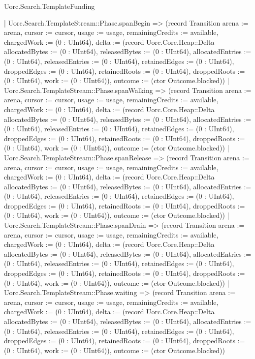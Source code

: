 \begin{lexlean}{Uorc.Search.TemplateFunding}
\begin{semanticmodule}
{      | Uorc.Search.TemplateStream::Phase.spanBegin => (record Transition {arena := arena, cursor := cursor, usage := usage, remainingCredits := available, chargedWork := (0 : UInt64), delta := (record Uorc.Core.Heap::Delta {allocatedBytes := (0 : UInt64), releasedBytes := (0 : UInt64), allocatedEntries := (0 : UInt64), releasedEntries := (0 : UInt64), retainedEdges := (0 : UInt64), droppedEdges := (0 : UInt64), retainedRoots := (0 : UInt64), droppedRoots := (0 : UInt64), work := (0 : UInt64)}), outcome := (ctor Outcome.blocked)})
      | Uorc.Search.TemplateStream::Phase.spanWalking => (record Transition {arena := arena, cursor := cursor, usage := usage, remainingCredits := available, chargedWork := (0 : UInt64), delta := (record Uorc.Core.Heap::Delta {allocatedBytes := (0 : UInt64), releasedBytes := (0 : UInt64), allocatedEntries := (0 : UInt64), releasedEntries := (0 : UInt64), retainedEdges := (0 : UInt64), droppedEdges := (0 : UInt64), retainedRoots := (0 : UInt64), droppedRoots := (0 : UInt64), work := (0 : UInt64)}), outcome := (ctor Outcome.blocked)})
      | Uorc.Search.TemplateStream::Phase.spanRelease => (record Transition {arena := arena, cursor := cursor, usage := usage, remainingCredits := available, chargedWork := (0 : UInt64), delta := (record Uorc.Core.Heap::Delta {allocatedBytes := (0 : UInt64), releasedBytes := (0 : UInt64), allocatedEntries := (0 : UInt64), releasedEntries := (0 : UInt64), retainedEdges := (0 : UInt64), droppedEdges := (0 : UInt64), retainedRoots := (0 : UInt64), droppedRoots := (0 : UInt64), work := (0 : UInt64)}), outcome := (ctor Outcome.blocked)})
      | Uorc.Search.TemplateStream::Phase.spanDrain => (record Transition {arena := arena, cursor := cursor, usage := usage, remainingCredits := available, chargedWork := (0 : UInt64), delta := (record Uorc.Core.Heap::Delta {allocatedBytes := (0 : UInt64), releasedBytes := (0 : UInt64), allocatedEntries := (0 : UInt64), releasedEntries := (0 : UInt64), retainedEdges := (0 : UInt64), droppedEdges := (0 : UInt64), retainedRoots := (0 : UInt64), droppedRoots := (0 : UInt64), work := (0 : UInt64)}), outcome := (ctor Outcome.blocked)})
      | Uorc.Search.TemplateStream::Phase.waiting => (record Transition {arena := arena, cursor := cursor, usage := usage, remainingCredits := available, chargedWork := (0 : UInt64), delta := (record Uorc.Core.Heap::Delta {allocatedBytes := (0 : UInt64), releasedBytes := (0 : UInt64), allocatedEntries := (0 : UInt64), releasedEntries := (0 : UInt64), retainedEdges := (0 : UInt64), droppedEdges := (0 : UInt64), retainedRoots := (0 : UInt64), droppedRoots := (0 : UInt64), work := (0 : UInt64)}), outcome := (ctor Outcome.blocked)})
}
\end{semanticmodule}
\end{lexlean}
